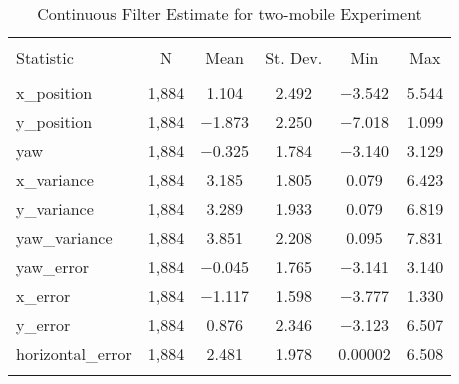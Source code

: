 
\begin{table}[h] \centering 
  \caption{Continuous Filter Estimate for two-mobile Experiment} 
  \label{tab:two_mobile_continuous_summary} 
\begin{tabular}{@{\extracolsep{5pt}}lccccc} 
\\[-1.8ex]\hline 
\hline \\[-1.8ex] 
Statistic & \multicolumn{1}{c}{N} & \multicolumn{1}{c}{Mean} & \multicolumn{1}{c}{St. Dev.} & \multicolumn{1}{c}{Min} & \multicolumn{1}{c}{Max} \\ 
\hline \\[-1.8ex] 
x\_position & 1,884 & 1.104 & 2.492 & $-$3.542 & 5.544 \\ 
y\_position & 1,884 & $-$1.873 & 2.250 & $-$7.018 & 1.099 \\ 
yaw & 1,884 & $-$0.325 & 1.784 & $-$3.140 & 3.129 \\ 
x\_variance & 1,884 & 3.185 & 1.805 & 0.079 & 6.423 \\ 
y\_variance & 1,884 & 3.289 & 1.933 & 0.079 & 6.819 \\ 
yaw\_variance & 1,884 & 3.851 & 2.208 & 0.095 & 7.831 \\ 
yaw\_error & 1,884 & $-$0.045 & 1.765 & $-$3.141 & 3.140 \\ 
x\_error & 1,884 & $-$1.117 & 1.598 & $-$3.777 & 1.330 \\ 
y\_error & 1,884 & 0.876 & 2.346 & $-$3.123 & 6.507 \\ 
horizontal\_error & 1,884 & 2.481 & 1.978 & 0.00002 & 6.508 \\ 
\hline \\[-1.8ex] 
\end{tabular} 
\end{table} 

